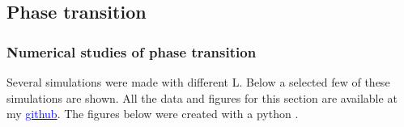 \pagebreak
\subsection{Phase transition}



\subsubsection{Numerical studies of phase transition}

Several simulations were made with different L. Below a selected few of these simulations are shown. All the data and figures for this section are available at my \href{https://github.com/erikfsk/Project-4/tree/master/Project4/Result/4e/}{\textcolor{blue}{github}}. The figures below were created with a python \href{https://github.com/erikfsk/Project-4/blob/master/Project4/Result/4e/plot-4e.py}{\color{blue}{script}}.

